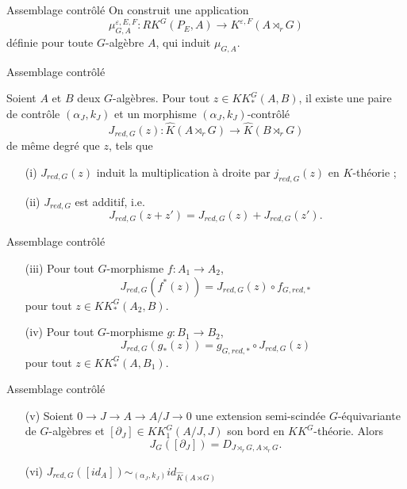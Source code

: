 \begin{frame}{Assemblage contrôlé}
On construit une application 
\[\mu_{G,A}^{\varepsilon, E,F} : RK^G(P_E,A) \rightarrow K^{\varepsilon, F}(A \rtimes_r G)\]
définie pour toute $G$-algèbre $A$, qui induit $\mu_{G,A}$. %
\end{frame}

\begin{frame}{Assemblage contrôlé}
\begin{propfr}
Soient $A$ et $B$ deux $G$-algèbres. Pour tout $z\in KK^G_*(A,B)$, il existe une paire de contrôle $(\alpha_J,k_J)$ et un morphisme $(\alpha_J,k_J)$-contrôlé
\[J_{red,G}(z) : \hat K(A\rtimes_r G)\rightarrow \hat K(B\rtimes_r G)\]
de même degré que $z$, tels que
\begin{enumerate}
\item[(i)] $J_{red,G}(z)$ induit la multiplication à droite par $j_{red,G}(z)$ en $K$-théorie ;
\item[(ii)] $J_{red,G}$ est additif, i.e.
\[J_{red,G}(z+z')=J_{red,G}(z)+J_{red,G}(z').\]
\end{enumerate}
\end{propfr}
\end{frame}

\begin{frame}{Assemblage contrôlé}
\begin{propfr}[suite]
\begin{enumerate}
\item[(iii)] Pour tout $G$-morphisme $f : A_1\rightarrow A_2$,
\[J_{red,G}(f^*(z))=J_{red,G}(z)\circ f_{G,red,*}\] pour tout $z\in KK_*^G(A_2,B)$.
\item[(iv)] Pour tout $G$-morphisme $g : B_1\rightarrow B_2$,
\[J_{red,G}(g_*(z))= g_{G,red,*}\circ J_{red,G}(z)\] pour tout $z\in KK_*^G(A,B_1)$.
\end{enumerate}
\end{propfr}
\end{frame}

\begin{frame}{Assemblage contrôlé}
\begin{propfr}[suite]
\begin{enumerate}
\item[(v)] Soient $0\rightarrow J\rightarrow A\rightarrow A/J\rightarrow 0$ une extension semi-scindée $G$-équivariante de $G$-algèbres et  $[\partial_J]\in KK_1^G(A/J,J)$ son bord en $KK^G$-théorie. Alors 
\[J_G([\partial_J])=D_{J\rtimes_r G,A\rtimes_rG}.\] 
\item[(vi)] $J_{red,G}([id_A]) \sim_{(\alpha_J,k_J)} id_{\hat K(A\rtimes G)}$
\end{enumerate}
\end{propfr}
\end{frame}

